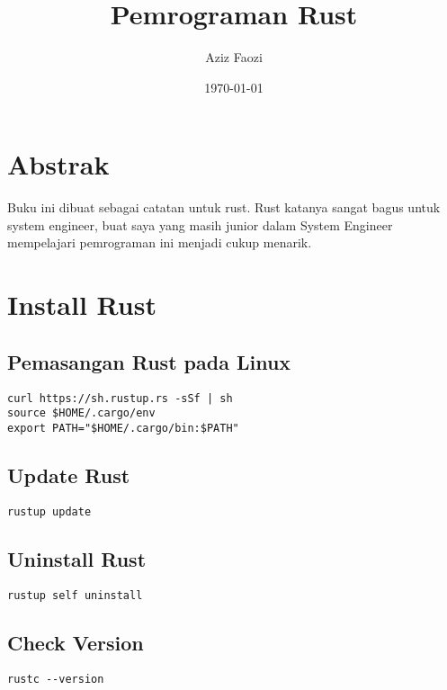 \documentclass[11pt]{article}
\author{Aziz Faozi}
\date{\today}
\title{Pemrograman Rust}
\begin{document}
\maketitle
\tableofcontents


\section{Abstrak}
\label{sec:orge747198}
Buku ini dibuat sebagai catatan untuk rust. Rust katanya sangat bagus untuk 
system engineer, buat saya yang masih junior dalam System Engineer mempelajari
pemrograman ini menjadi cukup menarik.

\section{Install Rust}
\label{sec:org4297dec}
\subsection{Pemasangan Rust pada Linux}
\label{sec:orgfda4baf}
\begin{verbatim}
curl https://sh.rustup.rs -sSf | sh
source $HOME/.cargo/env
export PATH="$HOME/.cargo/bin:$PATH"
\end{verbatim}
\subsection{Update Rust}
\label{sec:orgf886c82}
\begin{verbatim}
rustup update
\end{verbatim}
\subsection{Uninstall Rust}
\label{sec:org2fb48f9}
\begin{verbatim}
rustup self uninstall
\end{verbatim}

\subsection{Check Version}
\label{sec:orgf5b7373}
\begin{verbatim}
rustc --version
\end{verbatim}
\end{document}
